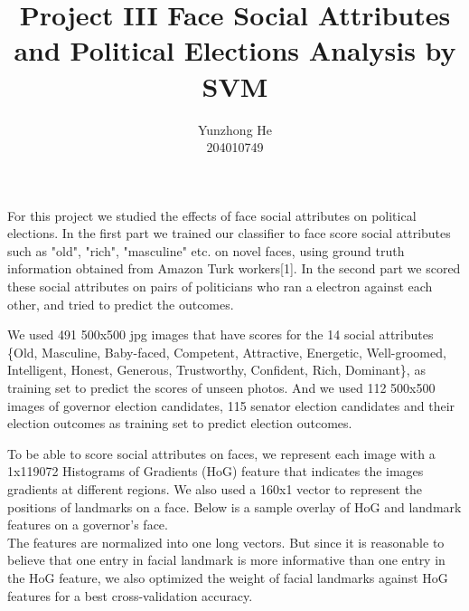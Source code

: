 \documentclass[12pt]{article}
\newenvironment{intro}[2][I Introduction]{\begin{trivlist}
\item[\hskip \labelsep {\bfseries #1}\hskip \labelsep {\bfseries #2}]}{\end{trivlist}}
\newenvironment{p1}[2][II Dataset]{\begin{trivlist}
\item[\hskip \labelsep {\bfseries #1}\hskip \labelsep {\bfseries #2}]}{\end{trivlist}}
\newenvironment{p2}[2][III Feature Designs]{\begin{trivlist}
\item[\hskip \labelsep {\bfseries #1}\hskip \labelsep {\bfseries #2}]}{\end{trivlist}}
\begin{document}
 
 
\title{Project III Face Social Attributes and Political Elections Analysis by SVM}
\author{Yunzhong He\\ %
204010749} %
 
\maketitle

\begin{intro}{}
\item{}
For this project we studied the effects of face social attributes on political elections. In the first part we trained our classifier to face score social attributes such as "old", "rich", "masculine" etc. on novel faces, using ground truth information obtained from Amazon Turk workers[1]. In the second part we scored these social attributes on pairs of politicians who ran a electron against each other, and tried to predict the outcomes.
\end{intro}

\begin{p1}{}
\item{}
We used 491 500x500 jpg images that have scores for the 14 social attributes \{Old, Masculine, Baby-faced, Competent, Attractive, Energetic, Well-groomed, Intelligent, Honest, Generous, Trustworthy, Confident, Rich, Dominant\}, as training set to predict the scores of unseen photos. And we used 112 500x500 images of governor election candidates, 115 senator election candidates and their election outcomes as training set to predict election outcomes.
\end{p1}

\begin{p2}{}
\item{}
To be able to score social attributes on faces, we represent each image with a 1x119072 Histograms of Gradients (HoG) feature that indicates the images gradients at different regions. We also used a 160x1 vector to represent the positions of landmarks on a face. Below is a sample overlay of HoG and landmark features on a governor's face.
\\
The features are normalized into one long vectors. But since it is reasonable to believe that one entry in facial landmark is more informative than one entry in the HoG feature, we also optimized the weight of facial landmarks against HoG features for a best cross-validation accuracy.
\end{p2}
\end{document}
